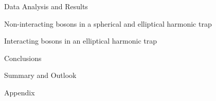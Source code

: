\documentclass[twoside,english, a4paper, 11pt]{shared/fysbachelor}
\begin{document}
\begin{part}{Data Analysis and Results}
	\label{part:results}
	\begin{chapter}{Non-interacting bosons in a spherical and elliptical harmonic trap}
	
	\end{chapter}
	
	\begin{chapter}{Interacting bosons in an elliptical harmonic trap}
	
	\end{chapter}
\end{part}
 
\begin{part}{Conclusions}
	\label{part:conclusion}
	\begin{chapter}{Summary and Outlook}
		\label{chap:conclusion}
		
	\end{chapter}	
\end{part}

\cleardoublepage





\begin{appendices}
	
	\begin{part}{Appendix}
	\end{part}
\end{appendices}
	
%
\printbibliography

 
 
\end{document}
